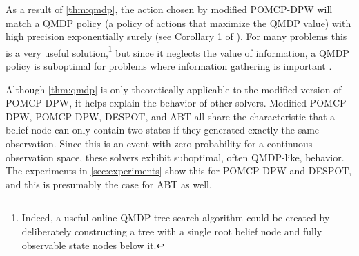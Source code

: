 As a result of \cref{thm:qmdp}, the action chosen by modified POMCP-DPW will match a QMDP policy (a policy of actions that maximize the QMDP value) with high precision exponentially surely (see Corollary 1 of \citet{auger2013continuous}).
For many problems this is a very useful solution,\footnote{Indeed, a useful online QMDP tree search algorithm could be created by deliberately constructing a tree with a single root belief node and fully observable state nodes below it.} but since it neglects the value of information, a QMDP policy is suboptimal for problems where information gathering is important \cite{littman1995learning,kochenderfer2015decision}.

Although \cref{thm:qmdp} is only theoretically applicable to the modified version of POMCP-DPW, it helps explain the behavior of other solvers.
Modified POMCP-DPW, POMCP-DPW, DESPOT, and ABT all share the characteristic that a belief node can only contain two states if they generated exactly the same observation.
Since this is an event with zero probability for a continuous observation space, these solvers exhibit suboptimal, often QMDP-like, behavior.
The experiments in \cref{sec:experiments} show this for POMCP-DPW and DESPOT, and this is presumably the case for ABT as well.


